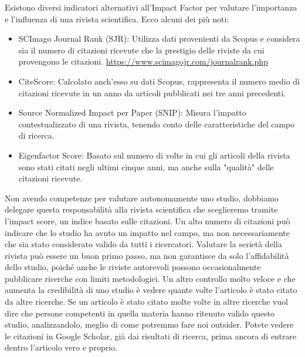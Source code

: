 \documentclass[12pt]{book} %
\begin{document}
Esistono diversi indicatori alternativi all'Impact Factor per valutare l'importanza e l'influenza di una rivista
scientifica. Ecco alcuni dei più noti:

\begin{itemize}
\item SCImago Journal Rank (SJR): Utilizza dati provenienti da Scopus e considera sia il numero di citazioni ricevute
che la prestigio delle riviste da cui provengono le citazioni. \url{https://www.scimagojr.com/journalrank.php} 
\item CiteScore: Calcolato anch'esso su dati Scopus, rappresenta il numero medio di citazioni ricevute in un anno da
articoli pubblicati nei tre anni precedenti.
\item Source Normalized Impact per Paper (SNIP): Misura l'impatto contestualizzato di una rivista, tenendo conto delle
caratteristiche del campo di ricerca.
\item Eigenfactor Score: Basato sul numero di volte in cui gli articoli della rivista sono stati citati negli ultimi
cinque anni, ma anche sulla "qualità" delle citazioni ricevute.
\end{itemize}

Non avendo competenze per valutare autonomamente uno studio, dobbiamo delegare questa responsabilità alla rivista
scientifica che sceglieremo tramite l'impact score, un indice basato sulle citazioni. Un alto numero di citazioni può indicare che lo studio ha avuto un impatto nel campo, ma non necessariamente che sia stato considerato valido da tutti i ricercatori. Valutare la serietà della rivista può essere un buon primo passo, ma non garantisce da solo l’affidabilità dello studio, poiché anche le riviste autorevoli possono occasionalmente pubblicare ricerche con limiti metodologici. Un altro controllo molto veloce e che aumenta la credibilità di uno
studio è vedere quante volte l'articolo è stato citato da altre ricerche. Se un articolo è stato
citato molte volte in altre ricerche vuol dire che persone competenti in quella materia hanno ritenuto valido questo
studio, analizzandolo, meglio di come potremmo fare noi outsider. Potete vedere le citazioni in Google Scholar, già dai
risultati di ricerca, prima ancora di entrare dentro l'articolo vero e proprio.
\end{document}
